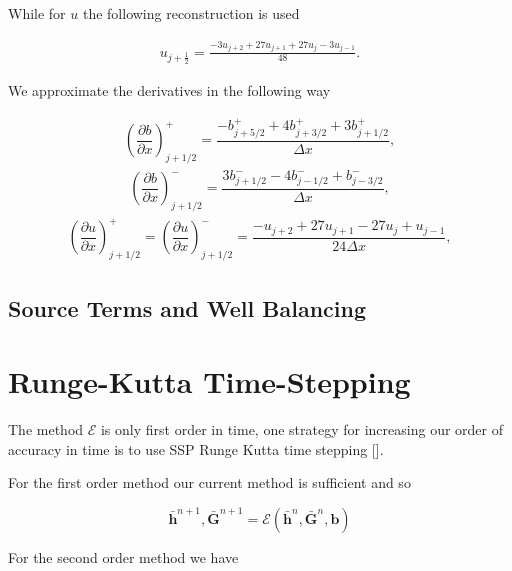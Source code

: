 While for $u$ the following reconstruction is used

\begin{gather}
u_{j + \frac{1}{2}} = \frac{-3u_{j+2} + 27u_{j+1} + 27u_j - 3u_{j-1}}{48} .
\end{gather}

We approximate the derivatives in the following way

\begin{gather}
\left( \dfrac{\partial b}{\partial x}\right)^+_{j+1/2} = \dfrac{-{b}^+_{j+5/2} + 4 {b}^+_{j+3/2} + 3 {b}^+_{j+1/2} }{\Delta x},
\end{gather}
\begin{gather}
\left( \dfrac{\partial b}{\partial x}\right)^-_{j+1/2} = \dfrac{3 {b}^-_{j+1/2} - 4 {b}^-_{j-1/2} + {b}^-_{j-3/2} }{\Delta x},
\end{gather}
\begin{gather}
\left( \dfrac{\partial u}{\partial x}\right)^+_{j+1/2} = \left( \dfrac{\partial u}{\partial x}\right)^-_{j+1/2} =   \dfrac{{-u_{j + 2} + 27u_{j+1} - 27u_{j} + u_{j-1}} }{24 \Delta x},
\end{gather}


\subsection{Source Terms and Well Balancing}


\section{Runge-Kutta Time-Stepping}
The method $\mathcal{E}$ is only first order in time, one strategy for increasing our order of accuracy in time is to use SSP Runge Kutta time stepping []. 

For the first order method our current method is sufficient and so

\begin{equation}
\bar{\boldsymbol{h}}^{n+1} , \bar{\boldsymbol{G}}^{n + 1} = \mathcal{E} \left(\bar{\boldsymbol{h}}^{n} , \bar{\boldsymbol{G}}^{n} , \boldsymbol{b}\right)
\end{equation}

For the second order method we have

